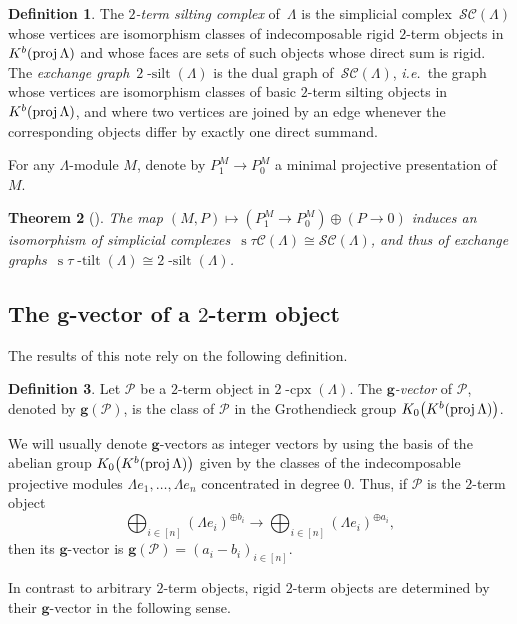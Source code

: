 \documentclass{compositio}
\newtheorem{theorem}{Theorem}%
\theoremstyle{definition}
\newtheorem{definition}[theorem]{Definition}
\renewcommand{\b}[1]{\mathbf{#1}} %
\newcommand{\ie}{\textit{i.e.}~} %
\newcommand{\darkblue}{\color{darkblue}} %
\newcommand{\defn}[1]{\textsl{\darkblue #1}} %
\newcommand{\complexP}{\mathcal{P}} %
\newcommand{\stau}{\operatorname{s} \! \tau \! \operatorname{-tilt}}
\newcommand{\cpx}{2 \! \operatorname{-cpx}}
\newcommand{\silt}{2 \! \operatorname{-silt}}
\newcommand{\siltingComplex}{\mathcal{SC}}
\newcommand{\tiltingComplex}{\operatorname{s} \! \tau\mathcal{C}}
\newcommand{\proj}{\operatorname{{\rm proj }}}
\begin{document}
\begin{definition}
The \defn{$2$-term silting complex} of~$\Lambda$ is the simplicial complex~$\siltingComplex(\Lambda)$ whose vertices are isomorphism classes of indecomposable rigid $2$-term objects in $K^b(\proj \Lambda)$ and whose faces are sets of such objects whose direct sum is rigid.
The \defn{exchange graph}~$\silt(\Lambda)$ is the dual graph of~$\siltingComplex(\Lambda)$, \ie the graph whose vertices are isomorphism classes of basic $2$-term silting objects in~$K^b(\proj \Lambda)$, and where two vertices are joined by an edge whenever the corresponding objects differ by exactly one direct summand.
\end{definition}

For any $\Lambda$-module $M$, denote by $P_1^M\to P_0^M$ a minimal projective presentation of $M$.

\begin{theorem}[{\cite[Thm.~3.2]{AdachiIyamaReiten}}]
The map $(M,P) \mapsto (P_1^M\to P_0^M) \oplus (P\to 0)$ induces an isomorphism of simplicial complexes~$\tiltingComplex(\Lambda) \cong \siltingComplex(\Lambda)$, and thus of exchange graphs~${\stau(\Lambda) \cong \silt(\Lambda)}$.
\end{theorem}


\subsection{The $\b{g}$-vector of a $2$-term object}

The results of this note rely on the following definition.

\begin{definition}
 Let $\complexP$ be a $2$-term object in $\cpx(\Lambda)$. 
 The \defn{$\b{g}$-vector} of $\complexP$, denoted by $\b{g}(\complexP)$, is the class of $\complexP$ in the Grothendieck group $K_0\big(K^b(\proj \Lambda)\big)$.
\end{definition}
We will usually denote $\b{g}$-vectors as integer vectors by using the basis of the abelian group $K_0\big(K^b(\proj \Lambda)\big)$ given by the classes of the indecomposable projective modules $\Lambda e_1, \dots, \Lambda e_n$ concentrated in degree $0$.
Thus, if $\complexP$ is the $2$-term object
\[
 \bigoplus_{i \in [n]} (\Lambda e_i)^{\oplus b_i} \xrightarrow{} \bigoplus_{i \in [n]} (\Lambda e_i)^{\oplus a_i},
\]
then its $\b{g}$-vector is $\b{g}(\complexP) = (a_i - b_i)_{i \in [n]}$.

In contrast to arbitrary $2$-term objects, rigid $2$-term objects are determined by their $\b{g}$-vector in the following sense.
\end{document}
